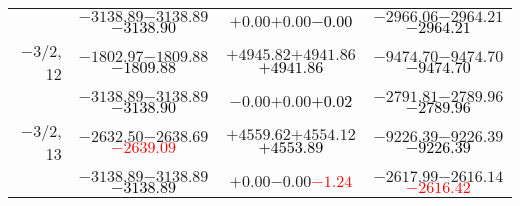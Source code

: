\documentclass[compress]{beamer}
\begin{document}
\begin{frame}
{\begin{tabular}{r | c | c | c}
           & $-3138.89$\hspace{0.1 cm}$-3138.89$\hspace{0.1 cm}\textcolor{black}{$-3138.90$} & $+0.00$\hspace{0.1 cm}$+0.00$\hspace{0.1 cm}\textcolor{black}{$-0.00$} & $-2966.06$\hspace{0.1 cm}$-2964.21$\hspace{0.1 cm}\textcolor{black}{$-2964.21$} \\
$-$3/2, 12 & $-1802.97$\hspace{0.1 cm}$-1809.88$\hspace{0.1 cm}\textcolor{black}{$-1809.88$} & $+4945.82$\hspace{0.1 cm}$+4941.86$\hspace{0.1 cm}\textcolor{black}{$+4941.86$} & $-9474.70$\hspace{0.1 cm}$-9474.70$\hspace{0.1 cm}\textcolor{black}{$-9474.70$} \\
           & $-3138.89$\hspace{0.1 cm}$-3138.89$\hspace{0.1 cm}\textcolor{black}{$-3138.90$} & $-0.00$\hspace{0.1 cm}$+0.00$\hspace{0.1 cm}\textcolor{black}{$+0.02$} & $-2791.81$\hspace{0.1 cm}$-2789.96$\hspace{0.1 cm}\textcolor{black}{$-2789.96$} \\
$-$3/2, 13 & $-2632.50$\hspace{0.1 cm}$-2638.69$\hspace{0.1 cm}\textcolor{red}{$-2639.09$} & $+4559.62$\hspace{0.1 cm}$+4554.12$\hspace{0.1 cm}\textcolor{black}{$+4553.89$} & $-9226.39$\hspace{0.1 cm}$-9226.39$\hspace{0.1 cm}\textcolor{black}{$-9226.39$} \\
           & $-3138.89$\hspace{0.1 cm}$-3138.89$\hspace{0.1 cm}\textcolor{black}{$-3138.89$} & $+0.00$\hspace{0.1 cm}$-0.00$\hspace{0.1 cm}\textcolor{red}{$-1.24$} & $-2617.99$\hspace{0.1 cm}$-2616.14$\hspace{0.1 cm}\textcolor{red}{$-2616.42$} \\

\end{tabular}}
\end{frame}
\end{document}

